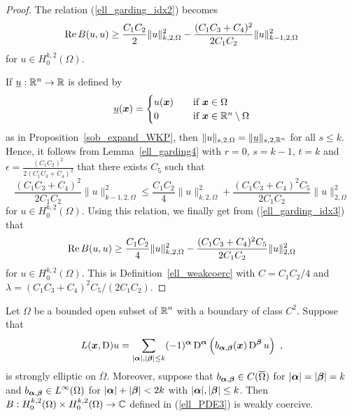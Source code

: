 \begin{proof}
The relation (\ref{ell_garding_idx2}) becomes
\begin{equation} \label{ell_garding_idx3}
\operatorname{Re} B(u,u) \geq \frac{C_1C_2}{2} \|u\|_{k,2,\Omega}^2
 - \frac{(C_1C_3 + C_4)^2}{2C_1C_2}\|u\|_{k-1,2,\Omega}^2
\end{equation}
for $\displaystyle u \in H^{k,2}_0(\Omega)$.

If $\underline{u}:\mathbb{R}^n\rightarrow \mathbb{R}$ is defined by
\[
\underline{u}({\bm{x}}) =
\begin{cases}
u({\bm{x}}) & \quad \text{if} \ {\bm{x}} \in \Omega \\
0 & \quad \text{if} \ {\bm{x}} \in \mathbb{R}^n \setminus \Omega
\end{cases}
\]
as in Proposition~\ref{sob_expand_WKP}, then
$\|u\|_{s,2,\Omega} = \|\underline{u}\|_{s,2,\mathbb{R}^n}$ for all
$s \leq k$.  Hence, it
follows from Lemma~\ref{ell_garding4} with $r=0$, $s=k-1$, $t=k$
and $\displaystyle \epsilon = \frac{(C_1C_2)^2}{2(C_1C_3 + C_4)^2}$ that
there exists $C_5$ such that
\[
\frac{(C_1C_3 + C_4)^2}{2C_1C_2}\|u\|_{k-1,2,\Omega}^2 \leq 
\frac{C_1C_2}{4} \|u\|_{k,2,\Omega}^2 + \frac{(C_1C_3 + C_4)^2 C_5}{2C_1C_2}
\|u\|_{2,\Omega}^2
\]
for $\displaystyle u \in H^{k,2}_0(\Omega)$.
Using this relation, we finally get from (\ref{ell_garding_idx3}) that
\[
\operatorname{Re} B(u,u) \geq \frac{C_1C_2}{4} \|u\|_{k,2,\Omega}^2
 - \frac{(C_1C_3 + C_4)^2 C_5}{2C_1C_2}\|u\|_{2,\Omega}^2
\]
for $\displaystyle u \in H^{k,2}_0(\Omega)$.
This is Definition~\ref{ell_weakcoerc} with $C=C_1C_2/4$ and
$\lambda = (C_1C_3 + C_4)^2 C_5/(2C_1C_2)$.
\end{proof}

\begin{theorem}  \label{ell_garding1}
Let $\Omega$ be a bounded open subset of $\displaystyle \mathbb{R}^n$ with a
boundary of class $\displaystyle C^2$.  Suppose that
\[
L({\bm{x}},\operatorname{D})u = \sum_{|{\bm{\alpha}}|,|{\bm{\beta}}|\leq k}
(-1)^{{\bm{\alpha}}} \operatorname{D}^{{\bm{\alpha}}}
\left( b_{{\bm{\alpha}},{\bm{\beta}}}({\bm{x}}) \operatorname{D}^{{\bm{\beta}}} u\right) \  ,
\]
is strongly elliptic on $\overline{\Omega}$.  Moreover, suppose that
$\displaystyle b_{{\bm{\alpha}},{\bm{\beta}}} \in C(\overline{\Omega})$ for
$|{\bm{\alpha}}|=|{\bm{\beta}}|=k$ and
$\displaystyle b_{{\bm{\alpha}},{\bm{\beta}}} \in L^\infty(\Omega)$ for
$|{\bm{\alpha}}|+|{\bm{\beta}}|<2k$ with $|{\bm{\alpha}}|,|{\bm{\beta}}|\leq k$.
Then
$\displaystyle B : H^{k,2}_0(\Omega) \times H^{k,2}_0(\Omega)\rightarrow \mathbb{C}$
defined in (\ref{ell_PDE3}) is weakly coercive.
\end{theorem}

